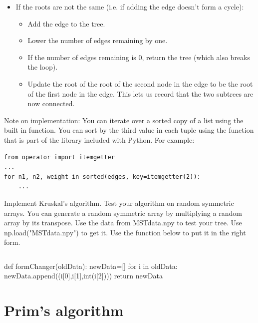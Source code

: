 \begin{itemize}
\begin{itemize}
	\item If the roots are not the same (i.e. if adding the edge doesn't form a cycle):

		\begin{itemize}

		\item Add the edge to the tree.

		\item Lower the number of edges remaining by one.

		\item If the number of edges remaining is 0, return the tree (which also breaks the loop).

		\item Update the root of the root of the second node in the edge to be the root of the first node in the edge.
			This lets us record that the two subtrees are now connected.

		\end{itemize}

	\end{itemize}

\end{itemize}
Note on implementation: You can iterate over a sorted copy of a list using the built in  function.
You can sort by the third value in each tuple using the  function that is part of the  library included with Python.
For example:
\begin{lstlisting}
from operator import itemgetter
...
for n1, n2, weight in sorted(edges, key=itemgetter(2)):
    ...
\end{lstlisting}

\begin{problem}
Implement Kruskal's algorithm.
Test your algorithm on random symmetric arrays.
You can generate a random symmetric array by multiplying a random array by its transpose.
Use the data from MSTdata.npy to test your tree.
Use np.load("MSTdata.npy") to get it.
Use the  function below to put it in the right form.
\begin{lstlisting}
\end{lstlisting}
def formChanger(oldData):
    newData=[]
    for i in oldData:
        newData.append((i[0],i[1],int(i[2])))
    return newData
\end{problem}
\section*{Prim's algorithm}

